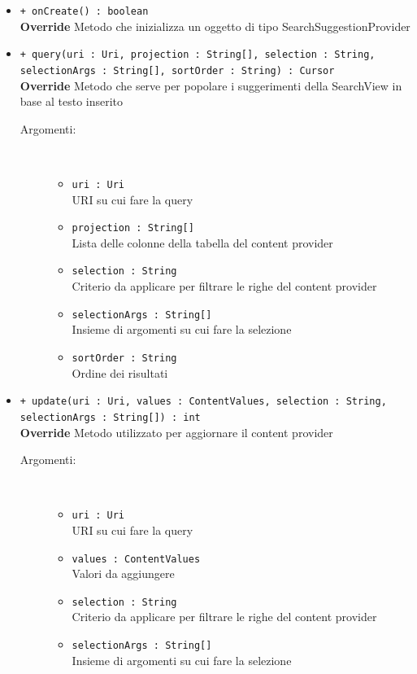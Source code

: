 \documentclass[../DefinizioneDiProdotto.tex]{subfiles}
\begin{document}
\begin{description}
\begin{itemize}
\begin{description}
		\end{description}
		\item \texttt{+ onCreate() : boolean}\\
		\textbf{Override} Metodo che inizializza un oggetto di tipo SearchSuggestionProvider
		\item \texttt{+ query(uri : Uri, projection : String[], selection : String, selectionArgs : String[], sortOrder : String) : Cursor}\\
		\textbf{Override} Metodo che serve per popolare i suggerimenti della SearchView in base al testo inserito
		\begin{description}
			\item[Argomenti:] \
			\begin{itemize}
				\item \texttt{uri : Uri}\\
				URI su cui fare la query\item \texttt{projection : String[]}\\
				Lista delle colonne della tabella del content provider\item \texttt{selection : String}\\
				Criterio da applicare per filtrare le righe del content provider\item \texttt{selectionArgs : String[]}\\
				Insieme di argomenti su cui fare la selezione\item \texttt{sortOrder : String}\\
				Ordine dei risultati\end{itemize}
		\end{description}
		\item \texttt{+ update(uri : Uri, values : ContentValues, selection : String, selectionArgs : String[]) : int}\\
		\textbf{Override} Metodo utilizzato per aggiornare il content provider
		\begin{description}
			\item[Argomenti:] \
			\begin{itemize}
				\item \texttt{uri : Uri}\\
				URI su cui fare la query\item \texttt{values : ContentValues}\\
				Valori da aggiungere\item \texttt{selection : String}\\
				Criterio da applicare per filtrare le righe del content provider\item \texttt{selectionArgs : String[]}\\
				Insieme di argomenti su cui fare la selezione\end{itemize}
		\end{description}
	\end{itemize}
\end{description}
\end{document}
